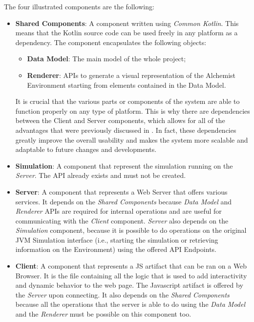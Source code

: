 The four illustrated components are the following:
\begin{itemize}
	\item \textbf{Shared Components}: A component written using \textit{Common Kotlin}. This means that the Kotlin source code can be used freely in any platform as a dependency. The component encapsulates the following objects:
	\begin{itemize}
		\item \textbf{Data Model}: The main model of the whole project;
		\item \textbf{Renderer}: APIs to generate a visual representation of the Alchemist Environment starting from elements contained in the Data Model.
	\end{itemize}
	It is crucial that the various parts or components of the system are able to function properly on any type of platform. This is why there are dependencies between the Client and Server components, which allows for all of the advantages that were previously discussed in . In fact, these dependencies greatly improve the overall usability and makes the system more scalable and adaptable to future changes and developments.
	\item \textbf{Simulation}: A component that represent the simulation running on the \textit{Server}. The API already exists and must not be created.
	\item \textbf{Server}: A component that represents a Web Server that offers various services. It depends on the \textit{Shared Components} because \textit{Data Model} and \textit{Renderer} APIs are required for internal operations and are useful for communicating with the \textit{Client} component. \textit{Server} also depends on the \textit{Simulation} component, because it is possible to do operations on the original JVM Simulation interface (i.e., starting the simulation or retrieving information on the Environment) using the offered API Endpoints.
	\item \textbf{Client}: A component that represents a JS artifact that can be ran on a Web Browser. It is the file containing all the logic that is used to add interactivity and dynamic behavior to the web page. The Javascript artifact is offered by the \textit{Server} upon connecting. It also depends on the \textit{Shared Components} because all the operations that the server is able to do using the \textit{Data Model} and the \textit{Renderer} must be possible on this component too.
\end{itemize}
